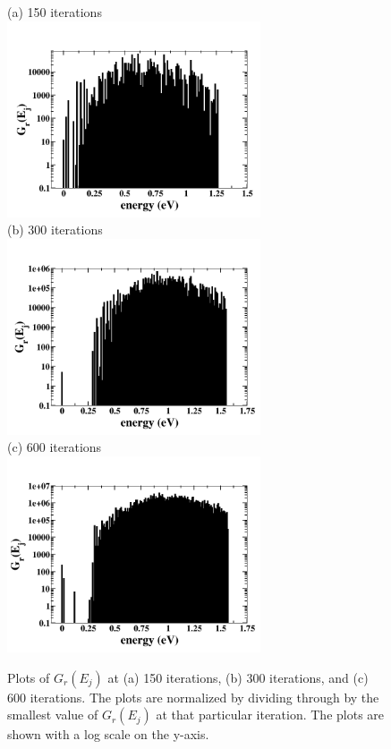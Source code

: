 \documentclass[aps,prl,reprint,superscriptaddress,showkeys]{revtex4-1}
\begin{document}
\begin{figure}[h!]
(a) 150 iterations\\
\includegraphics[width=7.5cm]{./figures/GE_fig_150.png}\\
(b) 300 iterations\\
\includegraphics[width=7.5cm]{./figures/GE_fig_300.png}\\
(c) 600 iterations\\
\includegraphics[width=7.5cm]{./figures/GE_fig_600.png}\\
\caption{Plots of $G_r(E_j)$ at (a) 150 iterations, (b) 300 iterations, and (c) 600 iterations. The plots are normalized by dividing through by the smallest value of $G_r(E_j)$ at that particular iteration. The plots are shown with a log scale on the y-axis.  \label{converge_GE}}
\end{figure}
\end{document}
